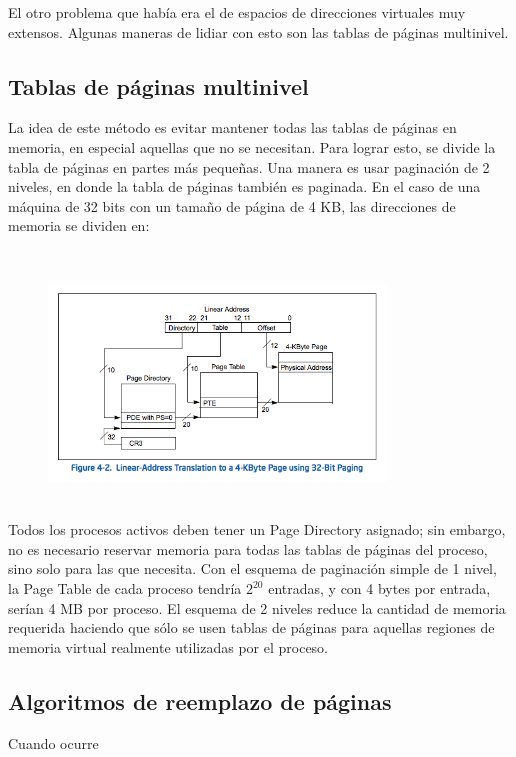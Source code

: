 El otro problema que había era el de espacios de direcciones virtuales muy extensos. Algunas maneras de lidiar con esto son las tablas de páginas multinivel.


\subsection{Tablas de páginas multinivel}

La idea de este método es evitar mantener todas las tablas de páginas en memoria, en especial aquellas que no se necesitan. Para lograr esto, se divide la tabla de páginas en partes más pequeñas. Una manera es usar paginación de 2 niveles, en donde la tabla de páginas también es paginada. En el caso de una máquina de 32 bits con un tamaño de página de 4 KB, las direcciones de memoria se dividen en:

~\\

\begin{figure}[h]
	\begin{center}
	\includegraphics[width=0.8\textwidth]{imagenes/32-bit-4k-paging.png}
	\end{center}
\end{figure}

~\\

Todos los procesos activos deben tener un Page Directory asignado; sin embargo, no es necesario reservar memoria para todas las tablas de páginas del proceso, sino solo para las que necesita. Con el esquema de paginación simple de 1 nivel, la Page Table de cada proceso tendría $2^{20}$ entradas, y con 4 bytes por entrada, serían 4 MB por proceso. El esquema de 2 niveles reduce la cantidad de memoria requerida haciendo que sólo se usen tablas de páginas para aquellas regiones de memoria virtual realmente utilizadas por el proceso.

\subsection{Algoritmos de reemplazo de páginas}

Cuando ocurre
